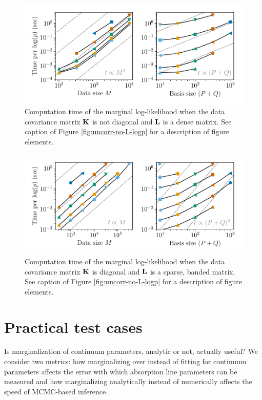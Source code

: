 \documentclass[manuscript]{aastex62}
\newcommand{\vx}[1]{{\bf {#1}}}
\begin{document}
\begin{figure}
  \includegraphics{corr_yes_L_scaling.pdf}
  \caption{Computation time of the marginal log-likelihood when the data covariance matrix $\vx{K}$ is not diagonal and $\vx{L}$ is a dense matrix. See caption of Figure \ref{fig:uncorr-no-L-logp} for a description of figure elements.}
  \label{fig:corr-yes-L-logp}
\end{figure}

\begin{figure}
  \includegraphics{uncorr_sparse_L_scaling.pdf}
  \caption{Computation time of the marginal log-likelihood when the data covariance matrix $\vx{K}$ is diagonal and $\vx{L}$ is a sparse, banded matrix. See caption of Figure \ref{fig:uncorr-no-L-logp} for a description of figure elements.}
  \label{fig:uncorr-sparse-L-logp}
\end{figure}

\section{Practical test cases}
\label{sec:test-cases}
Is marginalization of continuum parameters, analytic or not, actually useful?
We consider two metrics: how marginalizing over instead of fitting for continuum parameters affects the error with which absorption line parameters can be measured and how marginalizing analytically instead of numerically affects the speed of MCMC-based inference.
\end{document}
